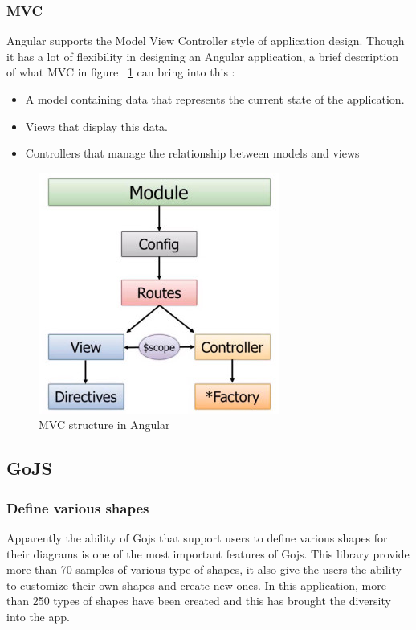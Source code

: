 \documentclass[14pt,a4paper]{extreport}
\begin{document}
			\subsubsection{MVC}
				Angular supports the Model View Controller style of application design. Though it has a lot of flexibility in designing an Angular application, a brief description of what MVC in figure ~\ref{MVC} can bring into this :
				\begin{itemize}
\item A model containing data that represents the current state of the application.
\item Views that display this data.
\item Controllers that manage the relationship between models and views
  				\end{itemize}
		\begin{figure}
			\begin{center}
				\includegraphics[scale=0.5]{angularmvc.png}
				\caption{MVC structure in Angular}
				\label{MVC}
			\end{center}
		\end{figure}
		
		\subsection{GoJS}
			\subsubsection{Define various shapes}
				Apparently the ability of Gojs that support users to define various shapes for their diagrams is one of the most important features of Gojs. This library provide more than 70 samples of various type of shapes, it also give the users the ability to customize their own shapes and create new ones. In this application, more than 250 types of shapes have been created and this has brought the diversity into the app.
\end{document}
